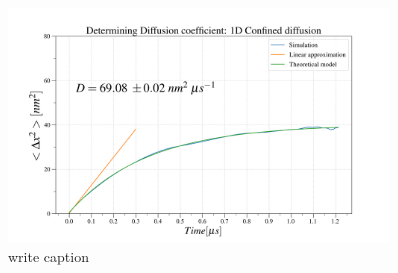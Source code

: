 \begin{figure}
\begin{center}
  \includegraphics[width=0.90\textwidth]{Figures/MR-100-diff.png}
  \caption{write caption}
\end{center}
\end{figure}
